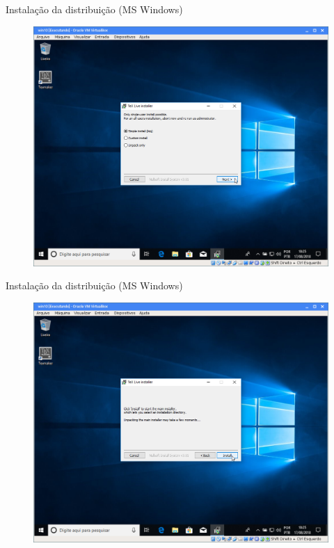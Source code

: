 \documentclass{beamer}
\begin{document}
\begin{frame}{Instala\c{c}\~ao da distribui\c{c}\~ao (MS Windows)}
    \begin{figure}[h]
        \includegraphics[scale=0.25]{fig/texlive-01.png}
    \end{figure}
\end{frame}

\begin{frame}{Instala\c{c}\~ao da distribui\c{c}\~ao (MS Windows)}
    \begin{figure}[h]
        \includegraphics[scale=0.25]{fig/texlive-02.png}
    \end{figure}
\end{frame}
\end{document}
